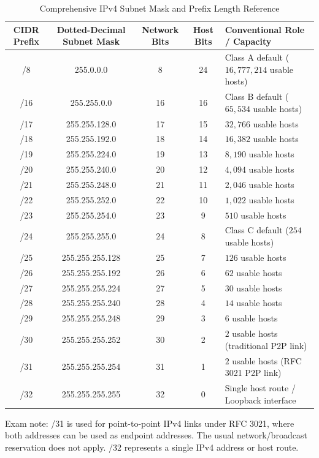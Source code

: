 \begin{table}[htbp]
\centering
\caption{Comprehensive IPv4 Subnet Mask and Prefix Length Reference}
\label{tab:common_subnet_masks}
\begin{tabularx}{\textwidth}{ccccX}
\toprule
\textbf{CIDR Prefix} & \textbf{Dotted-Decimal Subnet Mask} & \textbf{Network Bits} & \textbf{Host Bits} & \textbf{Conventional Role / Capacity} \\
\midrule
/8  & 255.0.0.0         & 8  & 24 & Class A default ($16,777,214$ usable hosts) \\
/16 & 255.255.0.0       & 16 & 16 & Class B default ($65,534$ usable hosts) \\
/17 & 255.255.128.0     & 17 & 15 & $32,766$ usable hosts \\
/18 & 255.255.192.0     & 18 & 14 & $16,382$ usable hosts \\
/19 & 255.255.224.0     & 19 & 13 & $8,190$ usable hosts \\
/20 & 255.255.240.0     & 20 & 12 & $4,094$ usable hosts \\
/21 & 255.255.248.0     & 21 & 11 & $2,046$ usable hosts \\
/22 & 255.255.252.0     & 22 & 10 & $1,022$ usable hosts \\
/23 & 255.255.254.0     & 23 & 9  & $510$ usable hosts \\
/24 & 255.255.255.0     & 24 & 8  & Class C default ($254$ usable hosts) \\
/25 & 255.255.255.128   & 25 & 7  & $126$ usable hosts \\
/26 & 255.255.255.192   & 26 & 6  & $62$ usable hosts \\
/27 & 255.255.255.224   & 27 & 5  & $30$ usable hosts \\
/28 & 255.255.255.240   & 28 & 4  & $14$ usable hosts \\
/29 & 255.255.255.248   & 29 & 3  & $6$ usable hosts \\
/30 & 255.255.255.252   & 30 & 2  & $2$ usable hosts (traditional P2P link) \\
/31 & 255.255.255.254   & 31 & 1  & $2$ usable hosts (RFC 3021 P2P link) \\
/32 & 255.255.255.255   & 32 & 0  & Single host route / Loopback interface \\
\bottomrule
\end{tabularx}
\end{table}
Exam note: /31 is used for point-to-point IPv4 links under RFC 3021, where both addresses can be used as endpoint addresses. The usual network/broadcast reservation does not apply. /32 represents a single IPv4 address or host route.
